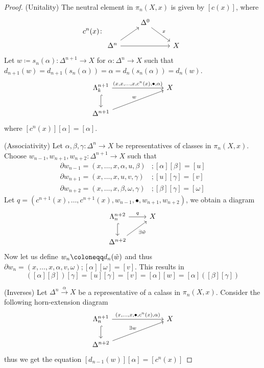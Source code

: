 \begin{proof}
    (Unitality) The neutral element in $\pi_n(X,x)$ is given by $[c(x)]$, where 
    \[
    c^n(x)\colon 
    \begin{tikzcd}
        &
        \Delta^0
        \ar[rd, "x"]
        &
        \\
        \Delta^n
        \ar[ru]
        \ar[rr]
        &&
        X
    \end{tikzcd}
    \]
    Let $w\coloneqq s_n(\alpha) \colon \Delta^{n+1} \to X$ for $\alpha\colon \Delta^n \to X$ such that $d_{n+1}(w)=d_{n+1}(s_n(\alpha))=\alpha=d_n(s_n(\alpha))=d_n(w)$.
    \[
    \begin{tikzcd}
        \Lambda_k^{n+1}
        \ar[d, hook]
        \ar[rrr, "{(x,x,\dotsc,x,c^n(x), \bullet, \alpha)}"]
        &&&
        X
        \\
        \Delta^{n+1}
        \ar[rrru, "w"]
    \end{tikzcd}
    \]
    where $[c^n(x)][\alpha]=[\alpha]$.

    (Associativity)
    Let $\alpha, \beta, \gamma \colon \Delta^n \to X$ be representatives of classes in $\pi_n(X,x)$.
    Choose $w_{n-1},w_{n+1},w_{n+2}\colon \Delta^{n+1} \to X$ such that 
    \begin{align*}
        \partial w_{n-1} =(x, \dotsc, x, \alpha, u, \beta) &; [\alpha][\beta]=[u]\\
        \partial w_{n+1} =(x, \dotsc, x, u, v, \gamma) &; [u][\gamma]=[v]\\
        \partial w_{n+2} =(x, \dotsc, x, \beta, \omega, \gamma) &; [\beta][\gamma]=[\omega]
    \end{align*}
    Let $q=(c^{n+1}(x), \dotsc , c^{n+1}(x), w_{n-1}, \bullet, w_{n+1}, w_{n+2})$, we obtain a diagram
    \[
    \begin{tikzcd}
        \Lambda_n^{n+2}
        \ar[r, "q"]
        \ar[d, hook]
        &
        X
        \\
        \Delta^{n+2}
        \ar[ru, " \exists \Tilde{w}"']
    \end{tikzcd}
    \]
    Now let us define $w_n \coloneqq d_n(\Tilde{w})$ and thus $\partial w_n = (x, \dotsc , x , \alpha, v, \omega) ; [\alpha][\omega]=[v]$. This results in 
    \[
    ([\alpha][\beta])[\gamma]=[u][\gamma]=[v]=[\alpha][w]=[\alpha]([\beta][\gamma])
    \]
    
    (Inverses)
    Let $\Delta^n \xrightarrow{\alpha} X$ be a representative of a calass in $\pi_n(X,x)$. 
    Consider the following horn-extension diagram
    \[
    \begin{tikzcd}
        \Lambda_n^{n+1}
        \ar[rrr, "{(x, \dotsc , x , \bullet , c^n(x), \alpha)}"]
        \arrow[d, hook]
        &&&
        X
        \\
        \Delta^{n+2}
        \ar[rrru, " \exists w"]
    \end{tikzcd}
    \]
    thus we get the equation $[d_{n-1}(w)][\alpha]=[c^n(x)]$


\end{proof}

